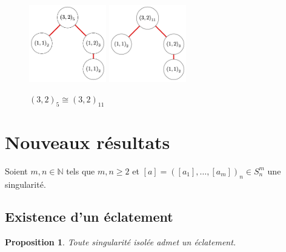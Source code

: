 \documentclass{article}
\newtheorem{proposition}{Proposition}
\begin{document}
\begin{figure}[h]
    \caption{${(3, 2)}_5 \cong {(3, 2)}_{11}$}
    \centering
    \includegraphics[width=0.3\textwidth]{532}
    \includegraphics[width=0.3\textwidth]{11_3_2}
\end{figure}

\newpage

\section{Nouveaux résultats}

Soient $m, n \in \mathbb{N}$ tels que $m, n \geq 2$ et $[a] = {([a_1], \dots, [a_m])}_n \in S_n^m$ une singularité.

\subsection{Existence d'un éclatement}

\begin{proposition}
    Toute singularité isolée admet un éclatement.
\end{proposition}
\end{document}

